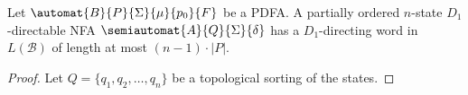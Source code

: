  
\begin{proposition}
 Let $\automat{B}{P}{\Sigma}{\mu}{p_0}{F}$
 be a PDFA.
 A partially ordered
 $n$-state
 $D_1$-directable NFA $\semiautomat{A}{Q}{\Sigma}{\delta}$ has a $D_1$-directing word 
 in $L(\mathcal B)$ of length at most $(n - 1) \cdot |P|$. 
\end{proposition}
\begin{proof}
 Let $Q = \{q_1, q_2, \ldots, q_n\}$
 be a topological sorting of the states.

\end{proof}
